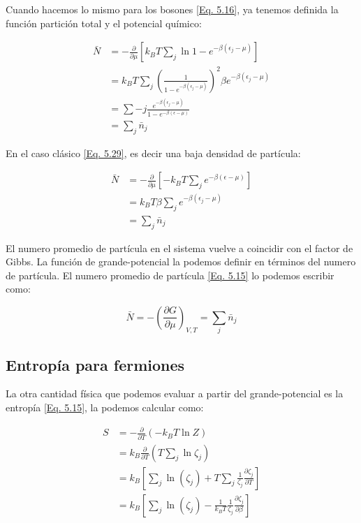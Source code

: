\documentclass[11pt,fleqn]{book}
\begin{document}
Cuando hacemos lo mismo para los bosones \ref{Eq. 5.16}, ya tenemos definida la función partición total y el potencial químico:

\begin{equation}
    \begin{split}
        \bar{N}&=-\frac{\partial}{\partial\mu}\left[k_{B}T\sum_{j}\ln{1-e^{-\beta(\epsilon_{j}-\mu)}}\right]\\
        &=k_{B}T\sum_{j}\left(\frac{1}{1-e^{-\beta(\epsilon_{j}-\mu)}}\right)^{2}\beta e^{-\beta(\epsilon_{j}-\mu)}\\
        &=\sum-{j}\frac{e^{-\beta(\epsilon_{j}-\mu)}}{1-e^{-\beta(\epsilon-\mu)}}\\
        &=\sum_{j}\bar{n}_{j}
    \end{split}
\end{equation}

En el caso clásico \ref{Eq. 5.29}, es decir una baja densidad de partícula:

\begin{equation}
    \begin{split}
        \bar{N}&=-\frac{\partial}{\partial\mu}\left[-k_{B}T\sum_{j}e^{-\beta(\epsilon-\mu)}\right]\\
        &=k_{B}T\beta\sum_{j}e^{-\beta(\epsilon_{j}-\mu)}\\
        &=\sum_{j}\bar{n}_{j}
    \end{split}
\end{equation}

El numero promedio de partícula en el sistema vuelve a coincidir con el factor de Gibbs. La función de grande-potencial la podemos definir en términos del numero de partícula.  El numero promedio de partícula \ref{Eq. 5.15} lo podemos escribir como:

\begin{equation}
\bar{N}=-\left(\frac{\partial G}{\partial \mu}\right)_{V,T}=\sum_{j}\bar{n}_{j}
\end{equation}

\subsection{Entropía para fermiones}

La otra cantidad física que podemos evaluar a partir del grande-potencial es la entropía \ref{Eq. 5.15}, la podemos calcular como:

\begin{equation}
    \begin{split}
        S&=-\frac{\partial}{\partial T}(-k_{B}T\ln{Z})\\
        &=k_{B}\frac{\partial}{\partial T}\left(T\sum_{j}\ln{\zeta_{j}}\right)\\
        &=k_{B}\left[\sum_{j}\ln(\zeta_{j})+T\sum_{j}\frac{1}{\zeta_{j}}\frac{\partial\zeta_{j}}{\partial T}\right]\\
        &=k_{B}\left[\sum_{j}\ln(\zeta_{j})-\frac{1}{k_{B}T}\frac{1}{\zeta_{j}}\frac{\partial\zeta_{j}}{\partial \beta}\right]
    \end{split}
\end{equation}
\end{document}
